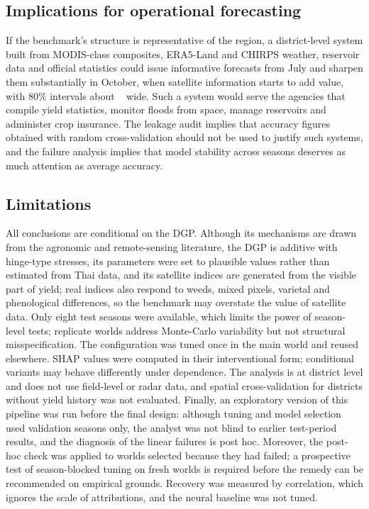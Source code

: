 \subsection{Implications for operational forecasting}
If the benchmark's structure is representative of the region, a district-level system built from MODIS-class composites, ERA5-Land and CHIRPS weather, reservoir data and official statistics could issue informative forecasts from July and sharpen them substantially in October, when satellite information starts to add value, with 80\% intervals about \widthEighty~\kgrai{} wide. Such a system would serve the agencies that compile yield statistics, monitor floods from space, manage reservoirs and administer crop insurance. The leakage audit implies that accuracy figures obtained with random cross-validation should not be used to justify such systems, and the failure analysis implies that model stability across seasons deserves as much attention as average accuracy.

\subsection{Limitations}
All conclusions are conditional on the DGP. Although its mechanisms are drawn from the agronomic and remote-sensing literature, the DGP is additive with hinge-type stresses, its parameters were set to plausible values rather than estimated from Thai data, and its satellite indices are generated from the visible part of yield; real indices also respond to weeds, mixed pixels, varietal and phenological differences, so the benchmark may overstate the value of satellite data. Only eight test seasons were available, which limits the power of season-level tests; replicate worlds address Monte-Carlo variability but not structural misspecification. The configuration was tuned once in the main world and reused elsewhere. SHAP values were computed in their interventional form; conditional variants may behave differently under dependence. The analysis is at district level and does not use field-level or radar data, and spatial cross-validation for districts without yield history was not evaluated. Finally, an exploratory version of this pipeline was run before the final design: although tuning and model selection used validation seasons only, the analyst was not blind to earlier test-period results, and the diagnosis of the linear failures is post hoc. Moreover, the post-hoc check was applied to worlds selected because they had failed; a prospective test of season-blocked tuning on fresh worlds is required before the remedy can be recommended on empirical grounds. Recovery was measured by correlation, which ignores the scale of attributions, and the neural baseline was not tuned.

